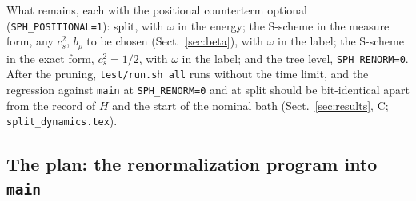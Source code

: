 \documentclass[11pt,aps,preprint,nofootinbib,superscriptaddress,tightenlines]{revtex4-2}
\def\Sect#1{Sect.~\ref{#1}}
\begin{document}
What remains, each with the positional counterterm optional (\texttt{SPH\_POSITIONAL=1}): split, with $\omega$ in the energy; the S-scheme in the
measure form, any $c_s^2$, $b_\rho$ to be chosen (\Sect{sec:beta}), with $\omega$ in the label; the S-scheme in the exact form, $c_s^2=1/2$, with
$\omega$ in the label; and the tree level, \texttt{SPH\_RENORM=0}.  After the pruning, \texttt{test/run.sh all} runs without the time limit, and
the regression against \texttt{main} at \texttt{SPH\_RENORM=0} and at split should be bit-identical apart from the record of $H$ and the start of
the nominal bath (\Sect{sec:results}, C; \nolinkurl{split_dynamics.tex}).

\subsection*{The plan: the renormalization program into \texttt{main}}
\end{document}

